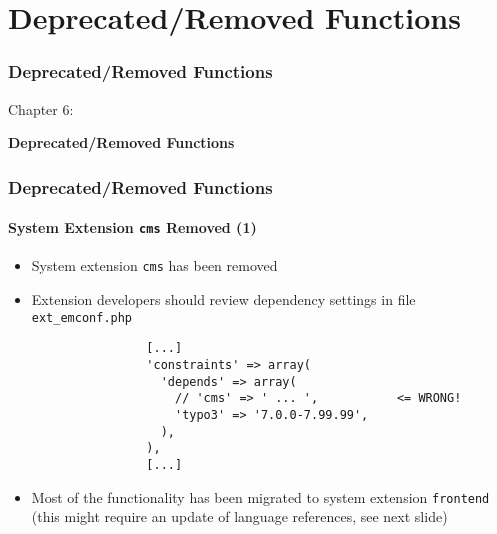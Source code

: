 %

\section{Deprecated/Removed Functions}
\begin{frame}[fragile]
	\frametitle{Deprecated/Removed Functions}

	\begin{center}\huge{Chapter 6:}\end{center}
	\begin{center}\huge{\color{typo3darkgrey}\textbf{Deprecated/Removed Functions}}\end{center}

\end{frame}


\begin{frame}[fragile]
	\frametitle{Deprecated/Removed Functions}
	\framesubtitle{System Extension \texttt{cms} Removed (1)}

	\lstset{basicstyle=\tiny\ttfamily}

	\begin{itemize}

		\item System extension \texttt{cms} has been removed

		\item Extension developers should review dependency settings in file \texttt{ext\_emconf.php}

			\begin{lstlisting}
				[...]
				'constraints' => array(
				  'depends' => array(
				    // 'cms' => ' ... ',           <= WRONG!
				    'typo3' => '7.0.0-7.99.99',
				  ),
				),
				[...]
			\end{lstlisting}

		\item Most of the functionality has been migrated to system extension \texttt{frontend}
			(this might require an update of language references, see next slide)

	\end{itemize}

\end{frame}

